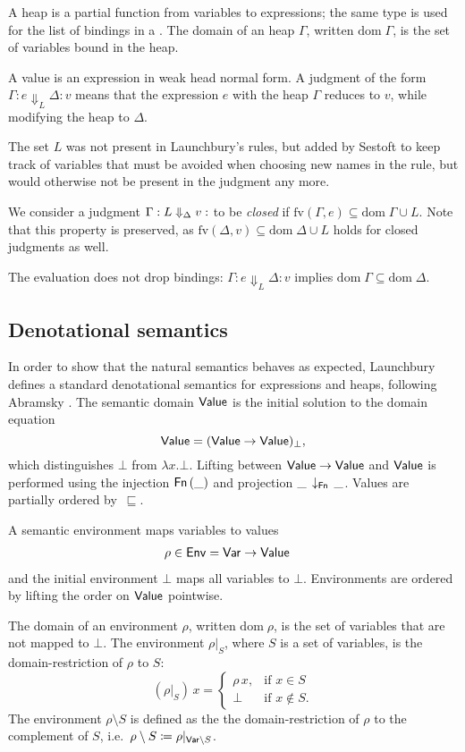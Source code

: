 \documentclass{jfp1}
\theoremstyle{nonumberbreak}
\newcommand{\sVar}   {\text{\textsf{Var}}}
\newcommand{\sValue} {\text{\textsf{Value}}}
\newcommand{\sEnv}   {\text{\textsf{Env}}}
\newcommand{\sFn}[1]{\text{\textsf{Fn}}\,(#1)}
\newcommand{\sFnProj}[2]{#1\,\downarrow_{\text{\textsf{Fn}}}\,#2}
\newcommand{\keyword}[1]{\text{\textsf{#1}}}
\newcommand{\sred}[5]{#1 : #2 \Downarrow_{#3} #4 : #5}
\newcommand{\sRule}[1]{\text{{\textsc{#1}}}}
\newcommand{\fv}[1]{\text{fv}(#1)}
\newcommand{\dom}[1]{\text{dom}\;#1}
\begin{document}
A heap is a partial function from variables to expressions; the same type is used for the list of bindings in a \keyword{let}. The domain of an heap $\Gamma$, written $\dom\Gamma$, is the set of variables bound in the heap.

A value is an expression in weak head normal form. A judgment of the form $\sred \Gamma e L \Delta v$ means that the expression $e$ with the heap $\Gamma$ reduces to $v$, while modifying the heap to $\Delta$.

The set $L$ was not present in Launchbury's rules, but added by Sestoft  to keep track of variables that must be avoided when choosing new names in the \sRule{Let} rule, but would otherwise not be present in the judgment any more.

We consider a judgment $\sred \Gamma L \Delta v$ to be \emph{closed} if $\fv{\Gamma, e} \subseteq \dom \Gamma \cup L$. Note that this property is preserved, as $\fv{\Delta, v} \subseteq \dom \Delta \cup L$ holds for closed judgments as well.

The evaluation does not drop bindings: $\sred \Gamma e L \Delta v$ implies $\dom \Gamma \subseteq \dom \Delta$.

\subsection{Denotational semantics}

In order to show that the natural semantics behaves as expected, Launchbury defines a standard denotational semantics for expressions and heaps, following Abramsky . The semantic domain $\sValue$ is the initial solution to the domain equation
\[
\sValue = (\sValue \to \sValue)_\bot,
\]
which distinguishes $\bot$ from $\lambda x. \bot$. Lifting between $\sValue \to \sValue$ and $\sValue$ is performed using the injection $\sFn \_$ and projection $\sFnProj{\_}{\_}$. Values are partially ordered by~$\sqsubseteq$.

A semantic environment maps variables to values
\begin{alignat*}{2}
\rho \in \sEnv &= \sVar \to \sValue
\end{alignat*}
and the initial environment $\bot$ maps all variables to $\bot$. Environments are ordered by lifting the order on $\sValue$ pointwise.

The domain of an environment $\rho$, written $\dom\rho$, is the set of variables that are not mapped to $\bot$.
The environment $\rho|_S$, where $S$ is a set of variables, is the domain-restriction of $\rho$ to $S$:
\[
(\rho |_S)\, x = 
\begin{cases}
\rho\, x,& \text{if } x \in S\\
\bot& \text{if } x \not\in S.
\end{cases}
\]
The environment $\rho\setminus S$ is defined as the the domain-restriction of $\rho$ to the complement of $S$, i.e.\ \mbox{$\rho\setminus S \coloneqq \rho|_{\sVar \setminus S}$}.
\end{document}
